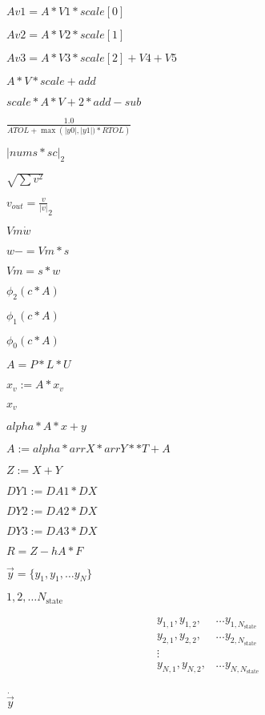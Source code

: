 \documentclass{article}
\begin{document}
$Av1 = A * V1 * scale[0]$
\pagebreak

$Av2 = A * V2 * scale[1]$
\pagebreak

$Av3 = A * V3 * scale[2] + V4 + V5$
\pagebreak

$A * V * scale + add$
\pagebreak

$scale * A * V + 2 * add - sub$
\pagebreak

$\frac{1.0}{ATOL + \max\left(\left|y0\right|, \left|y1\right|) * RTOL\right)}$
\pagebreak

$\left| nums * sc\right|_2$
\pagebreak

$\sqrt{\sum{v^2}}$
\pagebreak

$v_{out} = \frac{v}{\left| v \right|}_2$
\pagebreak

$Vm \dot w$
\pagebreak

$ w -= Vm * s$
\pagebreak

$Vm = s * w$
\pagebreak

$\phi_2(c*A)$
\pagebreak

$\phi_1(c*A)$
\pagebreak

$\phi_0(c*A)$
\pagebreak

$A = P * L * U$
\pagebreak

$x_v:= A*x_v$
\pagebreak

$x_v$
\pagebreak

$alpha*A*x + y$
\pagebreak

$A := alpha * arrX * arrY **T + A$
\pagebreak

$Z:= X + Y$
\pagebreak

$DY1:= DA1 * DX$
\pagebreak

$DY2:= DA2 * DX$
\pagebreak

$DY3:= DA3 * DX$
\pagebreak

$R = Z - hA * F$
\pagebreak

$\vec{y} = \{ y_1, y_1, \ldots y_N \}$
\pagebreak

$1, 2, \ldots N_{\text{state}}$
\pagebreak

\begin{align} \nonumber y_{1,1}, y_{1,2},& \ldots y_{1,N_{\text{state}}} \\ \nonumber y_{2,1}, y_{2,2},& \ldots y_{2,N_{\text{state}}} \\ \nonumber \vdots& \\ \nonumber y_{N,1}, y_{N,2},& \ldots y_{N,N_{\text{state}}} \\ \nonumber \end{align}
\pagebreak

$\dot{\vec{y}}$
\pagebreak
\end{document}

